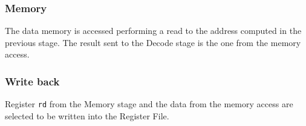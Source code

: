 \subsubsection{Memory}
The data memory is accessed performing a read to the address computed in the previous stage.
The result sent to the Decode stage is the one from the memory access.

\subsubsection{Write back}
Register \texttt{rd} from the Memory stage and the data from the memory access are selected to be written into the Register File.

